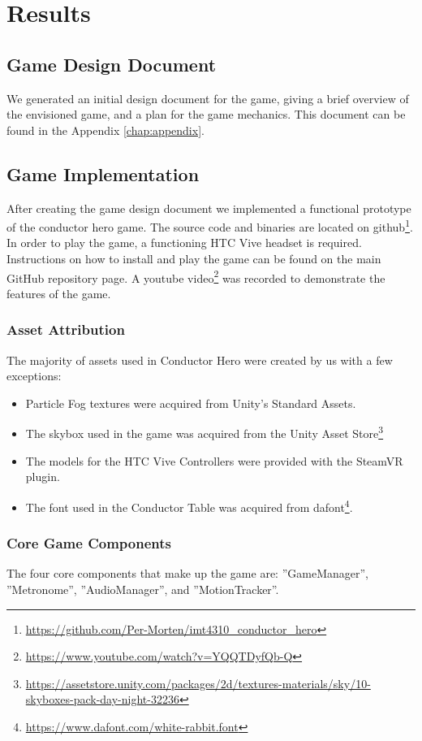 \chapter{Results} \label{chap:results}

\section{Game Design Document}
We generated an initial design document for the game, giving a brief overview of the envisioned game, and a plan for the game mechanics. This document can be found in the Appendix \ref{chap:appendix}.

\section{Game Implementation}
After creating the game design document we implemented a functional prototype of the conductor hero game. The source code and binaries are located on github\footnote{\url{https://github.com/Per-Morten/imt4310_conductor_hero}}. In order to play the game, a functioning HTC Vive headset is required. Instructions on how to install and play the game can be found on the main GitHub repository page. A youtube video\footnote{\url{https://www.youtube.com/watch?v=YQQTDyfQb-Q}} was recorded to demonstrate the features of the game.

\subsection{Asset Attribution}
The majority of assets used in Conductor Hero were created by us with a few exceptions:
\begin{itemize}
\item Particle Fog textures were acquired from Unity’s Standard Assets.
\item The skybox used in the game was acquired from the Unity Asset Store\footnote{\url{ https://assetstore.unity.com/packages/2d/textures-materials/sky/10-skyboxes-pack-day-night-32236}}   
\item The models for the HTC Vive Controllers were provided with the SteamVR plugin. 
\item The font used in the Conductor Table was acquired from dafont\footnote{\url{ https://www.dafont.com/white-rabbit.font}}. 
\end{itemize}

\subsection{Core Game Components}
The four core components that make up the game are: ''GameManager'', ''Metronome'', ''AudioManager'', and ''MotionTracker''.

